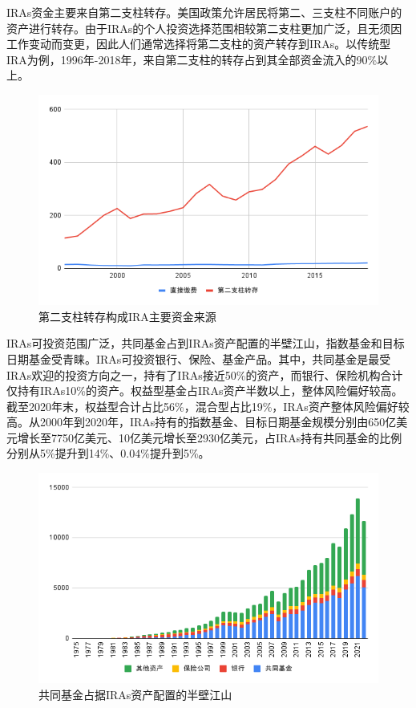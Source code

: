 \documentclass[a4paper,zihao=5]{ctexart}
\begin{document}
IRAs资金主要来自第二支柱转存。美国政策允许居民将第二、三支柱不同账户的资产进行转存。由于IRAs的个人投资选择范围相较第二支柱更加广泛，且无须因工作变动而变更，因此人们通常选择将第二支柱的资产转存到IRAs。以传统型IRA为例，1996年-2018年，来自第二支柱的转存占到其全部资金流入的90\%以上。
\begin{figure}[H]
    \centering
    \includegraphics[width=0.8\linewidth]{img/第二支柱转存构成传统型IRA主要资金来源.png}
    \caption{第二支柱转存构成IRA主要资金来源}
\end{figure}

IRAs可投资范围广泛，共同基金占到IRAs资产配置的半壁江山，指数基金和目标日期基金受青睐。IRAs可投资银行、保险、基金产品。其中，共同基金是最受IRAs欢迎的投资方向之一，持有了IRAs接近50\%的资产，而银行、保险机构合计仅持有IRAs10\%的资产。权益型基金占IRAs资产半数以上，整体风险偏好较高。截至2020年末，权益型合计占比56\%，混合型占比19\%，IRAs资产整体风险偏好较高。从2000年到2020年，IRAs持有的指数基金、目标日期基金规模分别由650亿美元增长至7750亿美元、10亿美元增长至2930亿美元，占IRAs持有共同基金的比例分别从5\%提升到14\%、0.04\%提升到5\%。
\begin{figure}[H]
    \centering
    \includegraphics[width=\linewidth]{img/共同基金占据IRAs资产配置的半壁江山.png}
    \caption{共同基金占据IRAs资产配置的半壁江山}
\end{figure}
\end{document}
